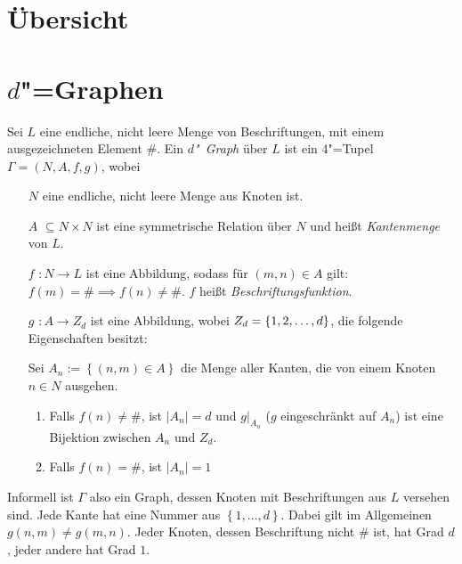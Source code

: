 \documentclass[11pt]{article}
\newcommand{\defWord}[1]{\emph{#1}}
\begin{document}
\clearpage


\section{Übersicht}

\section{$d$"=Graphen}
\begin{definition}[$d$"~Graph]
Sei $L$ eine endliche, nicht leere Menge von Beschriftungen, mit einem ausgezeichneten Element $\#$. 
Ein \defWord{$d$"~Graph} über $L$ ist ein 4"=Tupel $\Gamma = \left(N, A, f, g\right)$, wobei
\begin{itemize}
	\item[$N$] eine endliche, nicht leere Menge aus Knoten ist.
	\item[$A$] $\subseteq N \times N$ ist eine symmetrische Relation über $N$ und heißt \defWord{Kantenmenge} von $L$.
	\item[$f$] $: N \rightarrow L$ ist eine Abbildung, sodass für $\left(m, n\right) \in A$ gilt: $f\left(m\right) = \# \implies f\left(n\right) \neq \#$. $f$  heißt \defWord{Beschriftungsfunktion}.
	\item[$g$] $: A \rightarrow Z_d$ ist eine Abbildung, wobei $Z_d = \left \{1, 2,\text{\dots}, d \right \}$, die folgende Eigenschaften besitzt:
	
	Sei $A_n := \left \{\left(n, m\right) \in A\right \}$ die Menge aller Kanten, die von einem Knoten $n \in N$ ausgehen.
	\begin{enumerate}
		\item Falls $f\left(n\right) \neq \#$, ist $\left|A_n\right| = d$ und $g \vert_{A_n}$ ($g$ eingeschränkt auf $A_n$) ist eine Bijektion zwischen $A_n$ und $Z_d$.
		\item Falls $f\left(n\right) = \#$, ist $\left|A_n\right| = 1$
	\end{enumerate}
	
\end{itemize}
\end{definition}

Informell ist $\Gamma$ also ein Graph, dessen Knoten mit Beschriftungen aus $L$ versehen sind. 
Jede Kante hat eine Nummer aus $\left\{1, \dots, d\right\}$. 
Dabei gilt im Allgemeinen $g\left(n, m\right) \neq g\left(m, n\right)$. 
Jeder Knoten, dessen Beschriftung nicht $\#$ ist, hat Grad $d$, jeder andere hat Grad $1$. 
\end{document}

